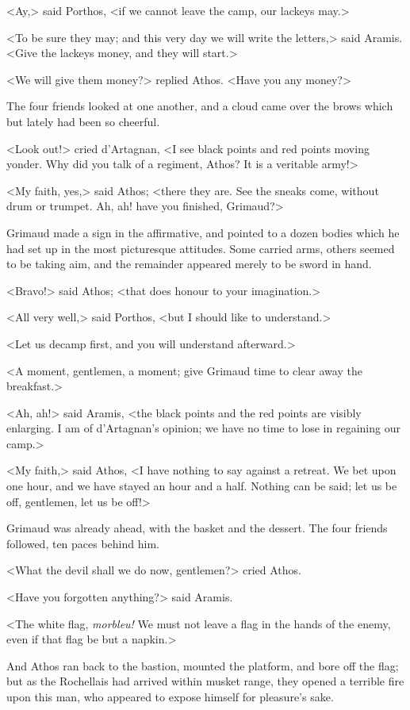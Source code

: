 <Ay,> said Porthos, <if we cannot leave the camp, our lackeys may.> 

<To be sure they may; and this very day we will write the letters,> said Aramis. <Give the lackeys money, and they will start.> 

<We will give them money?> replied Athos. <Have you any money?> 

The four friends looked at one another, and a cloud came over the brows which but lately had been so cheerful. 

<Look out!> cried d'Artagnan, <I see black points and red points moving yonder. Why did you talk of a regiment, Athos? It is a veritable army!> 

<My faith, yes,> said Athos; <there they are. See the sneaks come, without drum or trumpet. Ah, ah! have you finished, Grimaud?> 

Grimaud made a sign in the affirmative, and pointed to a dozen bodies which he had set up in the most picturesque attitudes. Some carried arms, others seemed to be taking aim, and the remainder appeared merely to be sword in hand. 

<Bravo!> said Athos; <that does honour to your imagination.> 

<All very well,> said Porthos, <but I should like to understand.> 

<Let us decamp first, and you will understand afterward.> 

<A moment, gentlemen, a moment; give Grimaud time to clear away the breakfast.> 

<Ah, ah!> said Aramis, <the black points and the red points are visibly enlarging. I am of d'Artagnan's opinion; we have no time to lose in regaining our camp.> 

<My faith,> said Athos, <I have nothing to say against a retreat. We bet upon one hour, and we have stayed an hour and a half. Nothing can be said; let us be off, gentlemen, let us be off!> 

Grimaud was already ahead, with the basket and the dessert. The four friends followed, ten paces behind him. 

<What the devil shall we do now, gentlemen?> cried Athos. 

<Have you forgotten anything?> said Aramis. 

<The white flag, \textit{morbleu!} We must not leave a flag in the hands of the enemy, even if that flag be but a napkin.> 

And Athos ran back to the bastion, mounted the platform, and bore off the flag; but as the Rochellais had arrived within musket range, they opened a terrible fire upon this man, who appeared to expose himself for pleasure's sake. 

